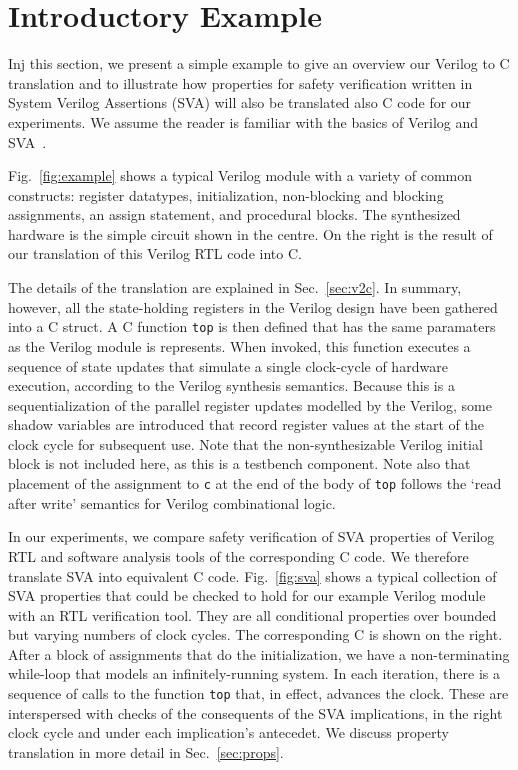 \section{Introductory Example} 

Inj this section, we present a simple example to give an overview our Verilog to C translation and to illustrate how properties for safety verification written in System Verilog Assertions (SVA) will also be translated also C code for our experiments. We assume the reader is familiar with the basics of Verilog and SVA~\cite{verilog}. 

Fig.~\ref{fig:example} shows a typical Verilog module with a variety of common constructs: register datatypes, initialization, non-blocking and blocking assignments, an assign statement, and procedural blocks.  The synthesized hardware is the simple circuit shown in the centre.  On the right is the result of our translation of this Verilog RTL code into C.

The details of the translation are explained in Sec.~\ref{sec:v2c}. In summary, however, all the state-holding registers in the Verilog design have been gathered into a C struct. A C function \texttt{top} is then defined that has the same paramaters as the Verilog module is represents. When invoked, this function executes a sequence of state updates that simulate a single clock-cycle of hardware execution, according to the Verilog synthesis semantics. Because this is a sequentialization of the parallel register updates modelled by the Verilog, some shadow variables are introduced that record register values at the start of the clock cycle for subsequent use. Note that the non-synthesizable Verilog initial block is not included here, as this is a testbench component. Note also that placement of the assignment to \texttt{c} at the end of the body of \texttt{top} follows the `read after write' semantics for Verilog combinational logic.

In our experiments, we compare safety verification of SVA properties of Verilog RTL and software analysis tools of the corresponding C code. We therefore translate SVA into equivalent C code. Fig.~\ref{fig:sva} shows a typical collection of SVA properties that could be checked to hold for our example Verilog module with an RTL verification tool. They are all conditional properties over bounded but varying numbers of clock cycles. The corresponding C is shown on the right. After a block of assignments that do the initialization, we have a non-terminating while-loop that models an infinitely-running system. In each iteration, there is a sequence of calls to the function \texttt{top} that, in effect, advances the clock. These are interspersed with checks of the consequents of the SVA implications, in the right clock cycle and under each implication's antecedet. We discuss property translation in more detail in Sec.~\ref{sec:props}.

